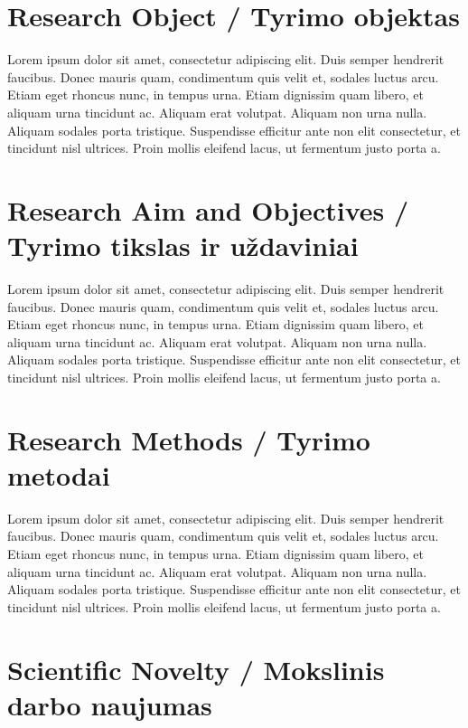 \section*{Research Object / Tyrimo objektas}

Lorem ipsum dolor sit amet, consectetur adipiscing elit. Duis semper hendrerit faucibus. Donec mauris quam, condimentum quis velit et, sodales luctus arcu. Etiam eget rhoncus nunc, in tempus urna. Etiam dignissim quam libero, et aliquam urna tincidunt ac. Aliquam erat volutpat. Aliquam non urna nulla. Aliquam sodales porta tristique. Suspendisse efficitur ante non elit consectetur, et tincidunt nisl ultrices. Proin mollis eleifend lacus, ut fermentum justo porta a.


\section*{Research Aim and Objectives / Tyrimo tikslas ir uždaviniai}

Lorem ipsum dolor sit amet, consectetur adipiscing elit. Duis semper hendrerit faucibus. Donec mauris quam, condimentum quis velit et, sodales luctus arcu. Etiam eget rhoncus nunc, in tempus urna. Etiam dignissim quam libero, et aliquam urna tincidunt ac. Aliquam erat volutpat. Aliquam non urna nulla. Aliquam sodales porta tristique. Suspendisse efficitur ante non elit consectetur, et tincidunt nisl ultrices. Proin mollis eleifend lacus, ut fermentum justo porta a.


\section*{Research Methods / Tyrimo metodai}

Lorem ipsum dolor sit amet, consectetur adipiscing elit. Duis semper hendrerit faucibus. Donec mauris quam, condimentum quis velit et, sodales luctus arcu. Etiam eget rhoncus nunc, in tempus urna. Etiam dignissim quam libero, et aliquam urna tincidunt ac. Aliquam erat volutpat. Aliquam non urna nulla. Aliquam sodales porta tristique. Suspendisse efficitur ante non elit consectetur, et tincidunt nisl ultrices. Proin mollis eleifend lacus, ut fermentum justo porta a.



\section*{Scientific Novelty / Mokslinis darbo naujumas} %

